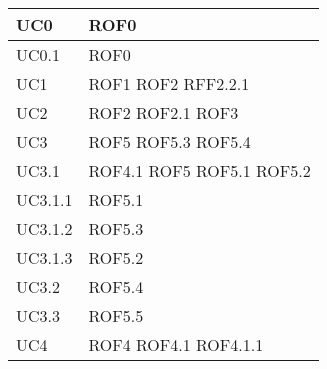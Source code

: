 \documentclass[../AnalisideiRequisiti.tex]{subfiles}
\begin{document}
\begin{longtable}{| p{4cm} | p{4cm} |}
	\hline
		\newline UC0 &  \newline ROF0 \\[1em]
	\hline
		\newline UC0.1 &  \newline ROF0 \\[1em]
	\hline
		\newline UC1 &  \newline ROF1 \newline ROF2 \newline RFF2.2.1   \\[1em]	
		\hline
		\newline UC2 &  \newline ROF2 	\newline ROF2.1 \newline ROF3 \\[1em]	
		\hline
		\newline UC3 &  \newline ROF5 \newline ROF5.3 \newline ROF5.4 \\[1em]	
		\hline
		\newline UC3.1 &  \newline ROF4.1 \newline ROF5 \newline ROF5.1 \newline ROF5.2  \\[1em]
		\hline
		\newline UC3.1.1 &  \newline ROF5.1 \\[1em]	
		\hline
		\newline UC3.1.2 &  \newline ROF5.3 \\[1em]
		\hline
		\newline UC3.1.3 &  \newline ROF5.2 \\[1em]
		\hline
		\newline UC3.2 &  \newline ROF5.4 \\[1em]
		\hline
		\newline UC3.3 &  \newline ROF5.5 \\[1em]
		\hline
		\newline UC4 &  \newline ROF4 \newline ROF4.1 \newline ROF4.1.1 \\[1em]

\end{longtable}
\end{document}
